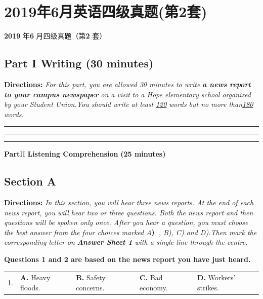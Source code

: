 \documentclass[UTF8,11pt]{ctexart}
\begin{document}
\section*{2019年6月英语四级真题(第2套)}
\textbf{2019} 年\textbf{6} 月四级真题（第\textbf{2} 套）


\subsection*{\textbf{Part I} \textbf{Writing} \textbf{(30 minutes)}}


\textbf{Directions:}\textit{ For this part, you are allowed 30 minutes to write}\textbf{\textit{ a news report to your campus newspaper}}\textit{ on a visit} \textit{to a Hope elementary school organized by your Student Union.You should write at least }\textit{\uline{120}}\textit{ words but no more} \textit{than}\textit{\uline{180}}\textit{ words.} \par\noindent\rule{.95\linewidth}{.4pt}\par  \par\noindent\rule{.95\linewidth}{.4pt}\par  \par\noindent\rule{.95\linewidth}{.4pt}\par  \textbf{Part}II \textbf{Listening Comprehension} \textbf{(25 minutes)}


\subsection*{\textbf{Section A}}


\textbf{Directions:}\textit{ In this section, you will hear three news reports. At the end of each news report, you will hear two or} \textit{three questions. Both the news report and then questions will be spoken only once. After you hear a question, you} \textit{must choose the best answer from the four choices marked A}）\textit{, B), C) and D).Then mark the corresponding letter} \textit{on}\textbf{\textit{ Answer Sheet 1}}\textit{ with a single line through the centre.}


\textbf{Questions 1 and 2 are based on the news report you have just heard.}


\noindent\begin{tabularx}{\linewidth}{@{}lXXXX@{}}1. & \textbf{A.} Heavy floods. & \textbf{B.} Safety concerns. & \textbf{C.} Bad economy. & \textbf{D.} Workers’ strikes.\\\end{tabularx}\par
\end{document}
